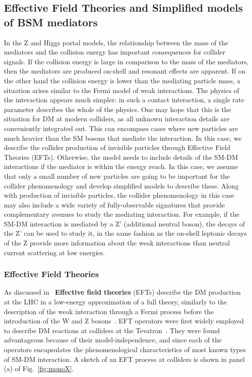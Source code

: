 \subsection{Effective Field Theories and Simplified models of BSM mediators}
\label{sec:BSMMediatorModels}

In the Z and Higgs portal models, the relationship between the mass of the mediators and the collision energy has important consequences for collider signals. If the collision energy is large in comparison to the mass of the mediators, then the mediators are produced on-shell and resonant effects are apparent. If on the other hand the collision energy is lower than the mediating particle mass, a situation arises similar to the Fermi model of weak interactions. The physics of the interaction appears much simpler: in such a contact interaction, a single rate parameter describes the whole of the physics. One may hope that this is the situation for DM at modern colliders, as all unknown interaction details are conveniently integrated out. 
This can encompass cases where new particles are much heavier than the SM bosons that mediate the interaction. In this case, we describe the collider production of invisible particles through Effective Field Theories (EFTs). Otherwise, the model needs to include details of the SM-DM interactions if the mediator is within the energy reach. In this case, we assume that only a small number of new particles are going to be important for the collider phenomenology and develop simplified models to describe these. Along with production of invisible particles, the collider phenomenology in this case may also include a wide variety of fully-observable signatures that provide complementary avenues to study the mediating interaction. For example, if the SM-DM interaction is mediated by a Z’ (additional neutral boson), the decays of the Z’ can be used to study it, in the same fashion as the on-shell leptonic decays of the Z provide more information about the weak interactions than  neutral current scattering at low energies.

\subsubsection{Effective Field Theories}
\label{sub:EFT}

As discussed in~\cite{Goodman:2010ku, Shoemaker:2011vi} \textbf{Effective field theories} (EFTs) describe the DM production at the LHC in a low-energy approximation of a full theory, similarly to the description of the weak interaction through a Fermi process before the introduction of the W and Z bosons~\cite{Fermi2008}. 
EFT operators were first widely employed to describe DM reactions at colliders at the Tevatron~\cite{Bai:2010hh,Beltran:2010ww}. They were found advantageous because of their model-independence, and since each of the operators encapsulates the phenomenological characteristics of most known types of SM-DM interaction. A sketch of an EFT process at colliders is shown in panel (a) of Fig.~\ref{fig:monoX}. 

